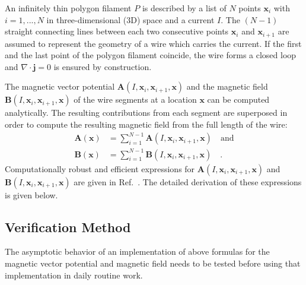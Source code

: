 
An infinitely thin polygon filament $P$ is described by a list of $N$ points $\mathbf{x}_i$ with $i=1, ..., N$ in three-dimensional (3D) space and a current $I$.
The $(N-1)$ straight connecting lines between each two consecutive points $\mathbf{x}_i$ and $\mathbf{x}_{i+1}$ are assumed to represent the geometry of a wire which carries the current.
If the first and the last point of the polygon filament coincide, the wire forms a closed loop and $\nabla \cdot \mathbf{j} = 0$ is ensured by construction.

The magnetic vector potential $\mathbf{A}(I, \mathbf{x}_i, \mathbf{x}_{i+1}, \mathbf{x})$ and the magnetic field $\mathbf{B}(I, \mathbf{x}_i, \mathbf{x}_{i+1}, \mathbf{x})$
of the wire segments at a location $\mathbf{x}$ can be computed analytically.
The resulting contributions from each segment are superposed in order to compute the resulting magnetic field from the full length of the wire:
\begin{align}
 \mathbf{A}(\mathbf{x}) & = \sum_{i=1}^{N-1} \mathbf{A}(I, \mathbf{x}_i, \mathbf{x}_{i+1}, \mathbf{x}) \quad \mathrm{and} \\
 \mathbf{B}(\mathbf{x}) & = \sum_{i=1}^{N-1} \mathbf{B}(I, \mathbf{x}_i, \mathbf{x}_{i+1}, \mathbf{x}) \quad .
\end{align}
Computationally robust and efficient expressions for
$\mathbf{A}(I, \mathbf{x}_i, \mathbf{x}_{i+1}, \mathbf{x})$ and
$\mathbf{B}(I, \mathbf{x}_i, \mathbf{x}_{i+1}, \mathbf{x})$
are given in Ref.~\cite{hanson_hirshman_2002}.
The detailed derivation of these expressions is given below.




\subsection{Verification Method}
The asymptotic behavior of an implementation of above formulas for the magnetic vector potential
and magnetic field needs to be tested before using that implementation in daily routine work.


